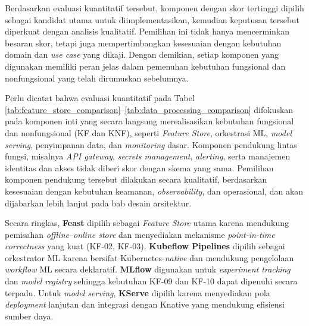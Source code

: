 \vspace{-0.5cm}



\vspace{-0.5cm}



\vspace{-0.5cm}



\vspace{-0.5cm}



\vspace{-0.5cm}

Berdasarkan evaluasi kuantitatif tersebut, komponen dengan skor tertinggi dipilih sebagai kandidat utama untuk diimplementasikan, kemudian keputusan tersebut diperkuat dengan analisis kualitatif. Pemilihan ini tidak hanya mencerminkan besaran skor, tetapi juga mempertimbangkan kesesuaian dengan kebutuhan domain dan \textit{use case} yang dikaji. Dengan demikian, setiap komponen yang digunakan memiliki peran jelas dalam pemenuhan kebutuhan fungsional dan nonfungsional yang telah dirumuskan sebelumnya.

Perlu dicatat bahwa evaluasi kuantitatif pada Tabel \ref{tab:feature_store_comparison}--\ref{tab:data_processing_comparison} difokuskan pada komponen inti yang secara langsung merealisasikan kebutuhan fungsional dan nonfungsional (KF dan KNF), seperti \textit{Feature Store}, orkestrasi ML, \textit{model serving}, penyimpanan data, dan \textit{monitoring} dasar. Komponen pendukung lintas fungsi, misalnya \textit{API gateway}, \textit{secrets management}, \textit{alerting}, serta manajemen identitas dan akses tidak diberi skor dengan skema yang sama. Pemilihan komponen pendukung tersebut dilakukan secara kualitatif, berdasarkan kesesuaian dengan kebutuhan keamanan, \textit{observability}, dan operasional, dan akan dijabarkan lebih lanjut pada bab desain arsitektur.

Secara ringkas, \textbf{Feast} dipilih sebagai \textit{Feature Store} utama karena mendukung pemisahan \textit{offline}--\textit{online store} dan menyediakan mekanisme \textit{point-in-time correctness} yang kuat (KF-02, KF-03). \textbf{Kubeflow Pipelines} dipilih sebagai orkestrator ML karena bersifat Kubernetes-\textit{native} dan mendukung pengelolaan \textit{workflow} ML secara deklaratif. \textbf{MLflow} digunakan untuk \textit{experiment tracking} dan \textit{model registry} sehingga kebutuhan KF-09 dan KF-10 dapat dipenuhi secara terpadu. Untuk \textit{model serving}, \textbf{KServe} dipilih karena menyediakan pola \textit{deployment} lanjutan dan integrasi dengan Knative yang mendukung efisiensi sumber daya.

